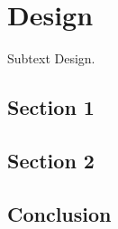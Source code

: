 \chapter{Design}
\label{chap:design}

Subtext Design.

\minitoc

\newpage

\section{Section 1}



\section{Section 2}



\section{Conclusion}

